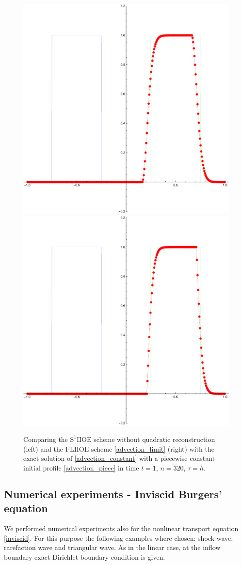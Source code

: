 \documentclass[../include.tex]{subfiles}
\begin{document}
\begin{figure}[h!]
	\centering
	\includegraphics[width=.49\textwidth]{figures/piece(S1IIOE)_320_h}
	\includegraphics[width=.49\textwidth]{figures/piece_320_h}
	\caption{Comparing the $\mathrm{S^1 IIOE}$ scheme without quadratic reconstruction (left) and the $\mathrm{FLIIOE}$ scheme \eqref{advection_limit} (right) with the exact solution of \eqref{advection_constant} with a piecewise constant initial profile \eqref{advection_piece} in time $ t=1 $, $ n=320 $, $ \tau=h $.}
	\label{fig:compare_S1FL_disc}
\end{figure}
\newpage
\subsection{Numerical experiments - Inviscid Burgers' equation} 

We performed numerical experiments also for the nonlinear transport equation \eqref{inviscid}. For this purpose the following examples where chosen: shock wave, rarefaction wave and triangular wave. As in the linear case, at the inflow boundary exact Dirichlet boundary condition is given.
\end{document}
